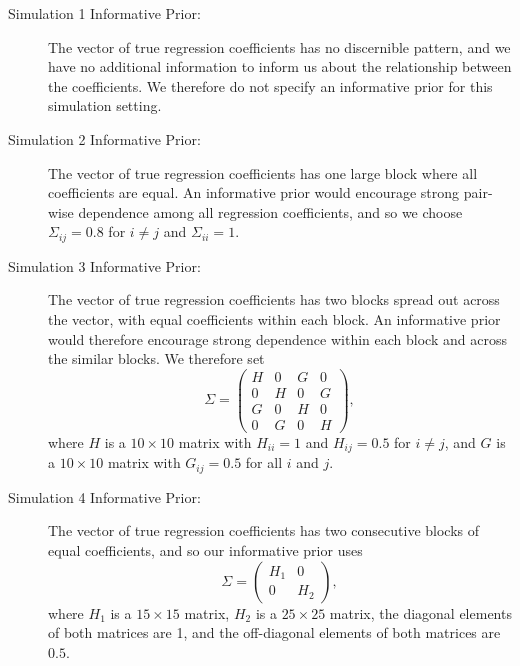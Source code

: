 \documentclass[12pt]{article}
\begin{document}
\begin{description}
\item[Simulation 1 Informative Prior:] The vector of true regression coefficients
has no discernible pattern, and we have no
additional information to inform us about the relationship between the coefficients. We therefore
do not specify an informative prior for this simulation setting.
\item[Simulation 2 Informative Prior:] The vector of true regression coefficients has one large
block where all coefficients are equal. An informative prior would encourage strong pair-wise
dependence among all regression coefficients, and so we choose $\Sigma_{ij} = 0.8$ for $i\neq j$
and $\Sigma_{ii} = 1$.
\item[Simulation 3 Informative Prior:] The vector of true regression coefficients has two
blocks spread out across the vector, with equal coefficients within each block. An informative
prior would therefore encourage strong dependence within each block and across the similar blocks.
We therefore set
\[
    \Sigma = \left( \begin{array}{cccc}
        H & 0 & G & 0 \\
        0 & H & 0 & G \\
        G & 0 & H & 0 \\
        0 & G & 0 & H 
    \end{array}\right),
\]
where $H$ is a $10 \times 10$ matrix with $H_{ii} = 1$ and $H_{ij} = 0.5$ for $i \neq j$,
and $G$ is a $10 \times 10$ matrix with $G_{ij} = 0.5$ for all $i$ and $j$. 
\item[Simulation 4 Informative Prior:] The vector of true regression coefficients has two consecutive
blocks of equal coefficients, and so our informative prior uses
\[
    \Sigma = \left( \begin{array}{cc}
            H_1 & 0 \\
            0 & H_2
    \end{array}\right),
\]
where $H_1$ is a $15\times 15$ matrix, $H_2$ is a $25 \times 25$ matrix, the diagonal elements
of both matrices are 1, and the off-diagonal elements of both matrices are $0.5$.
\end{description}
\end{document}
